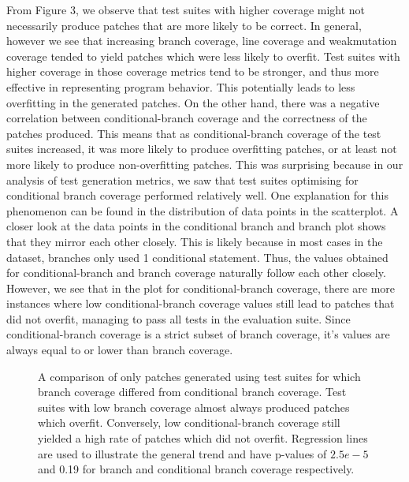 \documentclass[titlepage]{article}
\begin{document}
From Figure 3, we observe that test suites with higher coverage might not necessarily produce patches that are more likely to be correct. In general, however we see that increasing branch coverage, line coverage and weakmutation coverage tended to yield patches which were less likely to overfit. Test suites with higher coverage in those coverage metrics tend to be stronger, and thus more effective in representing program behavior. This potentially leads to less overfitting in the generated patches. 
On the other hand, there was a negative correlation between conditional-branch coverage and the correctness of the patches produced. This means that as conditional-branch coverage of the test suites increased, it was more likely to produce overfitting patches, or at least not more likely to produce non-overfitting patches. This was surprising because in our analysis of test generation metrics, we saw that test suites optimising for conditional branch coverage performed relatively well. One explanation for this phenomenon can be found in the distribution of data points in the scatterplot. A closer look at the data points in the conditional branch and branch plot shows that they mirror each other closely. This is likely because in most cases in the dataset, branches only used 1 conditional statement. Thus, the values obtained for conditional-branch and branch coverage naturally follow each other closely. However, we see that in the plot for conditional-branch coverage,  there are more instances where low conditional-branch coverage values still lead to patches that did not overfit, managing to pass all tests in the evaluation suite. Since conditional-branch coverage is a strict subset of branch coverage, it’s values are always equal to or lower than branch coverage.

\begin{figure}
    \caption{A comparison of only patches generated using test suites for which branch coverage differed from conditional branch coverage. Test suites with low branch coverage almost always produced patches which overfit. Conversely, low conditional-branch coverage still yielded a high rate of patches which did not overfit. Regression lines are used to illustrate the general trend and have p-values of $2.5e-5$ and 0.19 for branch and conditional branch coverage respectively.
}
    \centering
\end{figure}
\end{document}
